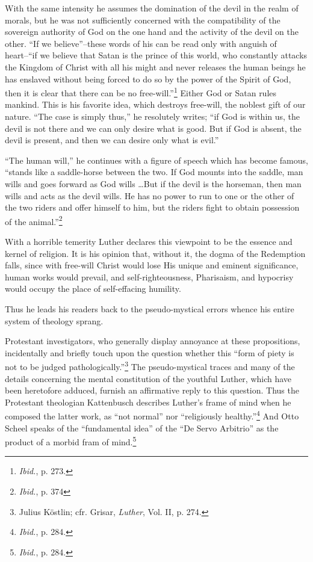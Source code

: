 With the same intensity he assumes the domination of the devil in the
realm of morals, but he was not sufficiently concerned with the compatibility
of the sovereign authority of God on the one hand and the activity of the
devil on the other. “If we believe”--these words of his can be read only with
anguish of heart--``if we believe that Satan is the prince of this world, who
constantly attacks the Kingdom of Christ with all his might and never
releases the human beings he has enslaved without being forced to do so by the
power of the Spirit of God, then it is clear that there can be no free-will.”\footnote{\textit{Ibid.}, p. 273.}
Either God or Satan rules mankind. This is his favorite idea, which destroys
free-will, the noblest gift of our nature. “The case is simply thus,”
he resolutely writes; “if God is within us, the devil is not there and we can only
desire what is good. But if God is absent, the devil is present, and then we
can desire only what is evil.”

“The human will,” he continues with a figure of speech which has become
famous, “stands like a saddle-horse between the two. If God mounts into
the saddle, man wills and goes forward as God wills \dots But if the devil
is the horseman, then man wills and acts as the devil wills. He has no power
to run to one or the other of the two riders and offer himself to him, but
the riders fight to obtain possession of the animal.”\footnote{\textit{Ibid.}, p. 374}

With a horrible temerity Luther declares this viewpoint to be
the essence and kernel of religion. It is his opinion that, without
it, the dogma of the Redemption falls, since with free-will Christ
would lose His unique and eminent significance, human works would
prevail, and self-righteousness, Pharisaism, and hypocrisy would occupy
the place of self-effacing humility.

Thus he leads his readers back to the pseudo-mystical errors whence
his entire system of theology sprang.

Protestant investigators, who generally display annoyance at these
propositions, incidentally and briefly touch upon the question whether
this “form of piety is not to be judged pathologically.”\footnote
{Julius Köstlin; cfr. Grisar, \textit{Luther}, Vol. II, p. 274.}
The
pseudo-mystical traces and many of the details concerning the mental
constitution of the youthful Luther, which have been heretofore
adduced, furnish an affirmative reply to this question. Thus the
Protestant theologian Kattenbusch describes Luther’s frame of mind
when he composed the latter work, as “not normal” nor “religiously
healthy.''\footnote{\textit{Ibid.}, p. 284.}
And Otto Scheel speaks of the ``fundamental idea'' of
the ``De Servo Arbitrio'' as the product of a morbid fram of mind.\footnote
{\textit{Ibid.}, p. 284.}

